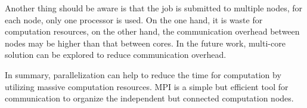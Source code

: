 \documentclass[sigchi]{acmart}
\begin{document}
Another thing should be aware is that the job is submitted to multiple nodes, for each node, only one processor is used.
On the one hand, it is waste for computation resources, on the other hand, the communication overhead between nodes may be higher than that between cores.
In the future work, multi-core solution can be explored to reduce communication overhead.

In summary, parallelization can help to reduce the time for computation by utilizing massive computation resources.
MPI is a simple but efficient tool for communication to organize the independent but connected computation nodes.  
%

\end{document}
